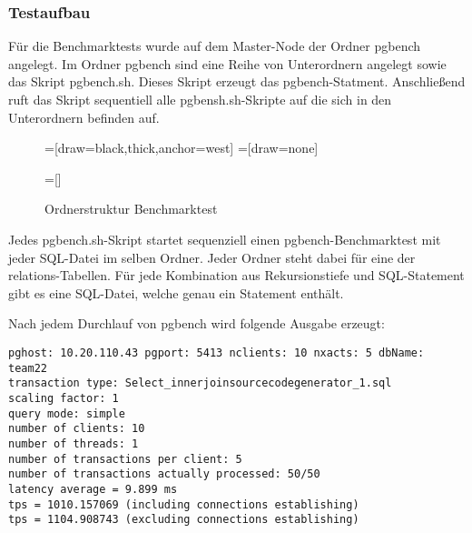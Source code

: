 \subsubsection{Testaufbau}
Für die Benchmarktests wurde auf dem Master-Node der Ordner pgbench angelegt. Im Ordner pgbench sind eine Reihe von Unterordnern angelegt sowie das Skript pgbench.sh. Dieses Skript erzeugt das pgbench-Statment. Anschließend ruft das Skript sequentiell alle pgbensh.sh-Skripte auf die sich in den Unterordnern befinden auf.
\begin{figure}[H]
=[draw=black,thick,anchor=west]
\usetikzlibrary{trees}
=[draw=none]
=[]
\caption{Ordnerstruktur Benchmarktest}
\label{2.pgbenchFile.image}
\end{figure}
Jedes pgbench.sh-Skript startet sequenziell einen pgbench-Benchmarktest mit jeder SQL-Datei im selben Ordner. Jeder Ordner steht dabei für eine der relations-Tabellen. Für jede Kombination aus Rekursionstiefe und SQL-Statement gibt es eine SQL-Datei, welche genau ein Statement enthält.

Nach jedem Durchlauf von pgbench wird folgende Ausgabe erzeugt:

\begin{lstlisting}[caption= Ausgabe pgbench, label={2.outputpgbench.listing}]
pghost: 10.20.110.43 pgport: 5413 nclients: 10 nxacts: 5 dbName: team22
transaction type: Select_innerjoinsourcecodegenerator_1.sql
scaling factor: 1
query mode: simple
number of clients: 10
number of threads: 1
number of transactions per client: 5
number of transactions actually processed: 50/50
latency average = 9.899 ms
tps = 1010.157069 (including connections establishing)
tps = 1104.908743 (excluding connections establishing)
\end{lstlisting}

